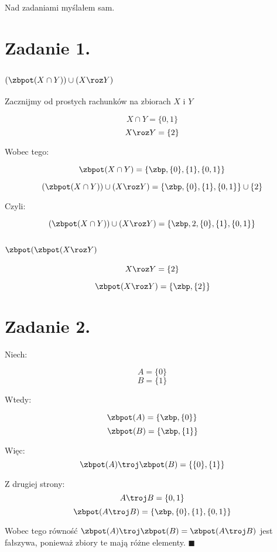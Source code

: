 \documentclass{article}
\begin{document}
 
 
 
 
 
 

\maketitle
Nad zadaniami myślałem sam.
\section*{Zadanie 1.}

\subsection*{$(\zbpot ( X \cap Y)) \cup (X \roz Y)$}
Zacznijmy od prostych rachunków na zbiorach $X$ i $Y$

\[X\cap Y = \{0,1\}\]
\[X\roz Y = \{2\}\]

Wobec tego:

\[\zbpot ( X \cap Y) = \{\zbp, \{0\}, \{1\}, \{0,1\}\} \]

\[(\zbpot ( X \cap Y)) \cup (X \roz Y) = \{\zbp, \{0\}, \{1\}, \{0,1\}\} \cup \{2\} \]

Czyli:

\[(\zbpot ( X \cap Y)) \cup (X \roz Y) = \{\zbp, 2, \{0\}, \{1\}, \{0,1\}\}  \]

\subsection*{$\zbpot (\zbpot(X\roz Y)$}

\[X\roz Y = \{2\}\]

\[\zbpot (X\roz Y) = \{\zbp,\{2\}\}\]


\section*{Zadanie 2.}

Niech:

\[A = \{0\}\]
\[B = \{1\}\]

Wtedy:

\[\zbpot (A) = \{\zbp,\{0\}\}\]
\[\zbpot (B) = \{\zbp,\{1\}\}\]

Więc:
\[ \zbpot (A) \troj \zbpot (B) = \{\{0\},\{1\}\} \]

Z drugiej strony:
\[A \troj B = \{0,1\}\]
\[\zbpot (A\troj B) = \{\zbp,\{0\},\{1\},\{0,1\}\}\]

Wobec tego równość $ \zbpot (A) \troj \zbpot (B) = \zbpot (A\troj B) $ jest fałszywa, ponieważ zbiory te mają różne elementy. $\blacksquare$
\end{document}

